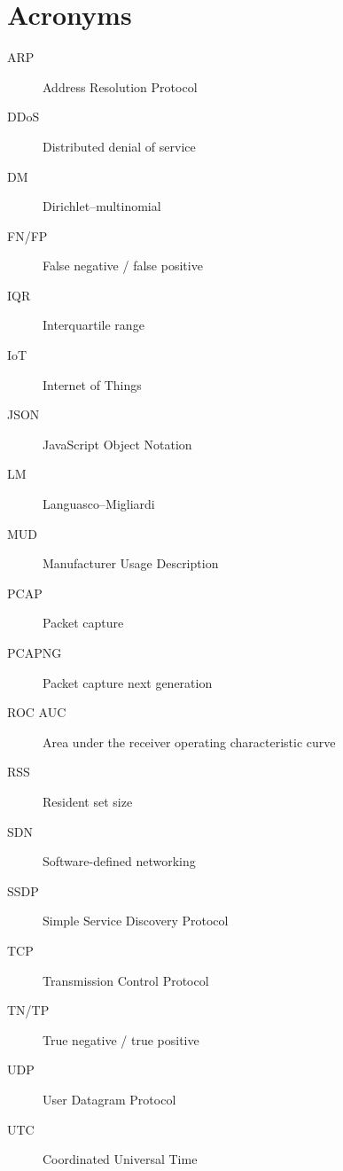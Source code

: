 \chapter*{Acronyms}
\begin{description}
  \item[ARP] Address Resolution Protocol
  \item[DDoS] Distributed denial of service
  \item[DM] Dirichlet--multinomial
  \item[FN/FP] False negative / false positive
  \item[IQR] Interquartile range
  \item[IoT] Internet of Things
  \item[JSON] JavaScript Object Notation
  \item[LM] Languasco--Migliardi
  \item[MUD] Manufacturer Usage Description
  \item[PCAP] Packet capture
  \item[PCAPNG] Packet capture next generation
  \item[ROC AUC] Area under the receiver operating characteristic curve
  \item[RSS] Resident set size
  \item[SDN] Software-defined networking
  \item[SSDP] Simple Service Discovery Protocol
  \item[TCP] Transmission Control Protocol
  \item[TN/TP] True negative / true positive
  \item[UDP] User Datagram Protocol
  \item[UTC] Coordinated Universal Time
\end{description}
